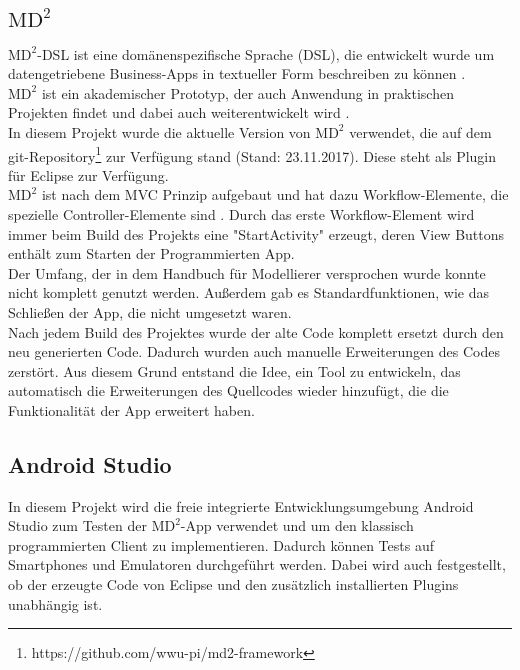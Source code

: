 \documentclass[a4paper,twoside]{article}
\begin{document}
	\subsection{$\text{MD}^2$}
	$\text{MD}^2$-DSL ist eine dom\"anenspezifische Sprache (DSL), die entwickelt wurde um datengetriebene Business-Apps in textueller Form beschreiben zu k\"onnen \cite{DSLMD2_2013}.\\
	$\text{MD}^2$ ist ein akademischer Prototyp, der auch Anwendung in praktischen Projekten findet und dabei auch weiterentwickelt wird \cite{MDCP2015}.\\
	In diesem Projekt wurde die aktuelle Version von $\text{MD}^2$ verwendet, die auf dem git-Repository\footnote{https://github.com/wwu-pi/md2-framework} zur Verf\"ugung stand (Stand: 23.11.2017). Diese steht als Plugin f\"ur Eclipse zur Verf\"ugung.\\
	$\text{MD}^2$ ist nach dem MVC Prinzip aufgebaut und hat dazu Workflow-Elemente, die spezielle Controller-Elemente sind \cite{Handbookmd2}. Durch das erste Workflow-Element wird immer beim Build des Projekts eine "StartActivity" erzeugt, deren View Buttons enth\"alt zum Starten der Programmierten App.\\
	Der Umfang, der in dem Handbuch f\"ur Modellierer versprochen wurde konnte nicht komplett genutzt werden. Au\ss{}erdem gab es Standardfunktionen, wie das Schlie\ss{}en der App, die nicht umgesetzt waren.\\
	Nach jedem Build des Projektes wurde der alte Code komplett ersetzt durch den neu generierten Code. Dadurch wurden auch manuelle Erweiterungen des Codes zerst\"ort. Aus diesem Grund entstand die Idee, ein Tool zu entwickeln, das automatisch die Erweiterungen des Quellcodes wieder hinzuf\"ugt, die die Funktionalit\"at der App erweitert haben.
	
	\subsection{Android Studio}
	In diesem Projekt wird die freie integrierte Entwicklungsumgebung Android Studio zum Testen der $\text{MD}^2$-App verwendet und um den klassisch programmierten Client zu implementieren. Dadurch k\"onnen Tests auf Smartphones und Emulatoren durchgef\"uhrt werden. Dabei wird auch festgestellt, ob der erzeugte Code von Eclipse und den zus\"atzlich installierten Plugins unabh\"angig ist.
	
\end{document}
